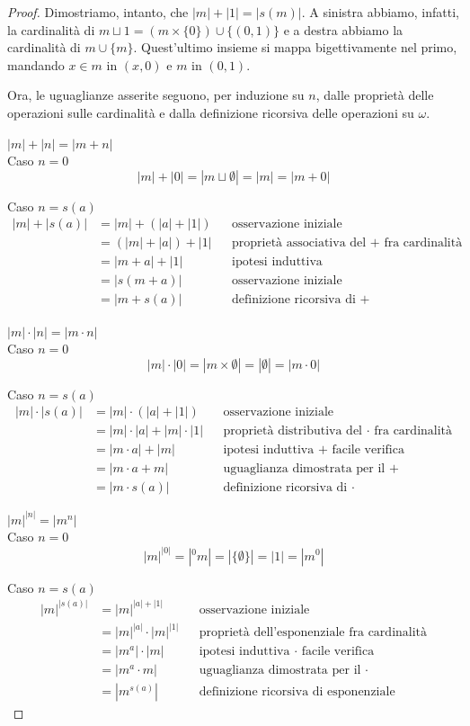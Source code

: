 \begin{proof}
	Dimostriamo, intanto, che $|m| + |1| = |s(m)|$. A sinistra abbiamo,
infatti, la cardinalit\`a di $m\sqcup 1 = (m \times \{0\}) \cup \{(0,1)\}$
e a destra abbiamo la cardinalit\`a di $m \cup \{m\}$.
	Quest'ultimo insieme si mappa bigettivamente nel primo, mandando $x \in m$ in $(x,0)$ e $m$ in $(0,1)$. 

Ora, le uguaglianze asserite seguono, per induzione su $n$, dalle propriet\`a delle operazioni sulle cardinalit\`a e dalla definizione ricorsiva delle operazioni su $\omega$.

{\drkblu $|m|+|n| = |m+n|$}\\
{\drkred Caso $n = 0$}
\[|m| + |0| =  |m \sqcup \emptyset| = |m| = |m + 0|\]

{\drkred Caso $n = s(a)$}
		\begin{align*}
|m| + |s(a)| &= |m| + (|a| + |1|) &&\text{osservazione iniziale}\\
	&= (|m| + |a|) + |1| &&\text{propriet\`a associativa del $+$ fra
cardinalit\`a}\\
	&= |m+a| + |1| &&\text{ipotesi induttiva}\\
	&= |s(m+a)| &&\text{osservazione iniziale}\\
	&= |m + s(a)| &&\text{definizione ricorsiva di~$+$}
 		\end{align*}

{\drkblu $|m|\cdot|n| = |m \cdot n|$}\\
{\drkred Caso $n = 0$}
\[|m| \cdot |0| =  |m \times \emptyset| = |\emptyset| = |m \cdot 0|\]

{\drkred Caso $n = s(a)$} 
		\begin{align*}
			|m| \cdot |s(a)| &= |m| \cdot (|a| + |1|) &&\text{osservazione iniziale}\\
&= |m| \cdot |a| + |m| \cdot |1| &&\text{propriet\`a distributiva del $\cdot$ fra cardinalit\`a}\\
&= |m \cdot a| + |m| &&\text{ipotesi induttiva $+$ facile verifica}\\
&= |m \cdot a + m| &&\text{uguaglianza dimostrata per il $+$}\\
&= |m \cdot s(a)| &&\text{definizione ricorsiva di~$\cdot$}
 		\end{align*}

{\drkblu $|m|^{|n|} = |m^n|$}\\
{\drkred Caso $n = 0$}
\[ |m|^{|0|} =  |{}^{0}m| = |\{\emptyset\}| =  |1| = |m^0| \]

{\drkred Caso $n = s(a)$}
		\begin{align*}
|m|^{|s(a)|} &= |m|^{|a| + |1|} &&\text{osservazione iniziale}\\
&= |m|^{|a|} \cdot |m|^{|1|} &&\text{propriet\`a dell'esponenziale fra
cardinalit\`a}\\
&= |m^a| \cdot |m| &&\text{ipotesi induttiva $\cdot$ facile verifica}\\
&= |m^a \cdot m| &&\text{uguaglianza dimostrata per il $\cdot$}\\
&= |m^{s(a)}| &&\text{definizione ricorsiva di esponenziale}
 		\end{align*}
\end{proof}

